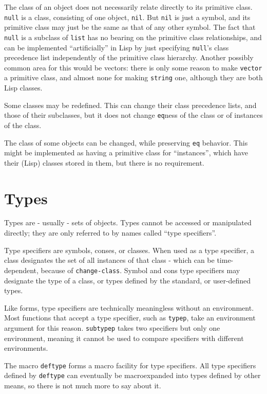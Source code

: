 \documentclass{article}
\begin{document}
The class of an object does not necessarily relate directly to its primitive class. \texttt{null} is a class, consisting of one object, \texttt{nil}. But \texttt{nil} is just a symbol, and its primitive class may just be the same as that of any other symbol. The fact that \texttt{null} is a subclass of \texttt{list} has no bearing on the primitive class relationships, and can be implemented ``artificially'' in Lisp by just specifying \texttt{null}'s class precedence list independently of the primitive class hierarchy. Another possibly common area for this would be vectors: there is only some reason to make \texttt{vector} a primitive class, and almost none for making \texttt{string} one, although they are both Lisp classes.

Some classes may be redefined. This can change their class precedence lists, and those of their subclasses, but it does not change \texttt{eq}ness of the class or of instances of the class.

The class of some objects can be changed, while preserving \texttt{eq} behavior. This might be implemented as having a primitive class for ``instances'', which have their (Lisp) classes stored in them, but there is no requirement.


\section{Types}

Types are - usually - sets of objects. Types cannot be accessed or manipulated directly; they are only referred to by names called ``type specifiers''.

Type specifiers are symbols, conses, or classes. When used as a type specifier, a class designates the set of all instances of that class - which can be time-dependent, because of \texttt{change-class}. Symbol and cons type specifiers may designate the type of a class, or types defined by the standard, or user-defined types.

Like forms, type specifiers are technically meaningless without an environment. Most functions that accept a type specifier, such as \texttt{typep}, take an environment argument for this reason. \texttt{subtypep} takes two specifiers but only one environment, meaning it cannot be used to compare specifiers with different environments.

The macro \texttt{deftype} forms a macro facility for type specifiers. All type specifiers defined by \texttt{deftype} can eventually be macroexpanded into types defined by other means, so there is not much more to say about it.
\end{document}
